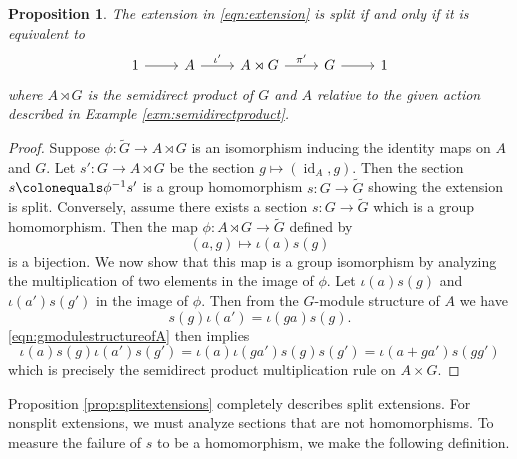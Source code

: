 \documentclass{dcthesis}
\newcommand{\wt}[1]{\widetilde{#1}}
\DeclareMathOperator{\id}{id}
\numberwithin{equation}{section}
\newtheorem{prop}[equation]{Proposition}
\theoremstyle{definition}
\newtheorem{definition}[equation]{Definition}
\theoremstyle{remark}
\begin{document}
{{{\begin{prop}
      The extension in
      \eqref{eqn:extension}
      is split
      if and only if
      it is equivalent to
      \[
        \begin{tikzcd}
          1\arrow{r}&A\arrow{r}{\iota'}
                    &A\rtimes G\arrow{r}{\pi'}
                    &G\arrow{r}&1
        \end{tikzcd}
      \]
      where $A\rtimes G$ is the semidirect product
      of $G$ and $A$ relative to the given action
      described in
      Example \ref{exm:semidirectproduct}.
    \end{prop}
    \begin{proof}
      Suppose $\phi\colon\wt{G}\to A\rtimes G$
      is an isomorphism inducing the identity maps
      on $A$ and $G$.
      Let $s'\colon G\to A\rtimes G$ be the section
      $g\mapsto (\id_A,g)$.
      Then the section $s\colonequals\phi^{-1}s'$
      is a group homomorphism
      $s\colon G\to\wt{G}$
      showing the extension is split.
      Conversely,
      assume there exists
      a section
      $s\colon G\to\wt{G}$
      which is a group homomorphism.
      Then the map $\phi\colon A\rtimes G\to\wt{G}$ defined by
      \[
        (a,g)\mapsto\iota(a)s(g)
      \]
      is a bijection.
      We now show that this map is a group isomorphism
      by analyzing the multiplication of two
      elements in the image of $\phi$.
      Let $\iota(a)s(g)$ and $\iota(a')s(g')$
      in the image of $\phi$.
      Then
      from the $G$-module structure of $A$ we have
      \begin{equation}
        \label{eqn:gmodulestructureofA}
        s(g)\iota(a')=\iota(ga)s(g).
      \end{equation}
      \eqref{eqn:gmodulestructureofA}
      then implies
      \[
        \iota(a)s(g)\iota(a')s(g')=\iota(a)\iota(ga')s(g)s(g')=\iota(a+ga')s(gg')
      \]
      which is precisely the semidirect product multiplication
      rule on $A\times G$.
    \end{proof}
    Proposition \ref{prop:splitextensions}
    completely describes split extensions.
    For nonsplit extensions,
    we must analyze sections that are
    not homomorphisms.
    To measure the failure of $s$
    to be a homomorphism,
    we make the following definition.
}}}
\end{document}
